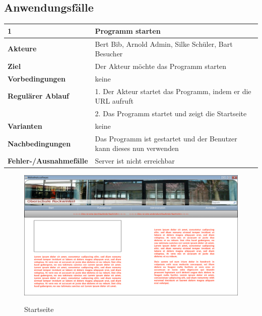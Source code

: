 \documentclass[fontsize=12pt,paper=a4,twoside]{scrartcl}
\begin{document}
\newpage
\subsection{Anwendungsfälle}

\begin{table}[htbp]
\label{1}
\begin{tabular}{|l|p{10cm}|}
\hline 
\textbf{1} & \textbf{Programm starten} \\ \hline
\textbf{Akteure} & Bert Bib, Arnold Admin, Silke Schüler, Bart Besucher\\ \hline
\textbf{Ziel} & Der Akteur möchte das Programm starten  \\ \hline
\textbf{Vorbedingungen} & keine \\ \hline
\textbf{Regulärer Ablauf} & 
1. Der Akteur startet das Programm, indem er die URL aufruft \\
&2. Das Programm startet und zeigt die Startseite \\ \hline
\textbf{Varianten} & keine \\ \hline
\textbf{Nachbedingungen} & Das Programm ist gestartet und der Benutzer kann dieses nun verwenden\\ 
\hline
\textbf{Fehler-/Ausnahmefälle} & Server ist nicht erreichbar \\ \hline
\end{tabular}
\end{table}

\begin{figure}[htbp]
\caption{Startseite}
\includegraphics[width=1\textwidth]{ScreensWebsite/StartseiteLoggedOut.png}
\label{startseite}
\end{figure}
\end{document}
